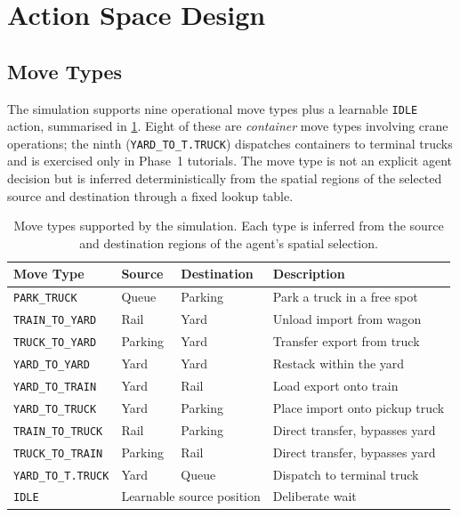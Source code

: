 \section{Action Space Design}
\label{sec:sys:actions}

\subsection{Move Types}
\label{sec:sys:actions:types}

The simulation supports nine operational move types plus a learnable \texttt{IDLE} action, summarised in \cref{tab:sys:move_types}. Eight of these are \emph{container} move types involving crane operations; the ninth (\texttt{YARD\_TO\_T.TRUCK}) dispatches containers to terminal trucks and is exercised only in Phase~1 tutorials. The move type is not an explicit agent decision but is inferred deterministically from the spatial regions of the selected source and destination through a fixed lookup table.

\begin{table}[H]
  \centering
  \caption{Move types supported by the simulation. Each type is inferred from the source and destination regions of the agent's spatial selection.}
  \label{tab:sys:move_types}
  \begin{tabular}{@{} l l l l @{}}
    \toprule
    \textbf{Move Type} & \textbf{Source} & \textbf{Destination} & \textbf{Description} \\
    \midrule
    \texttt{PARK\_TRUCK}      & Queue   & Parking & Park a truck in a free spot \\
    \texttt{TRAIN\_TO\_YARD}  & Rail    & Yard    & Unload import from wagon \\
    \texttt{TRUCK\_TO\_YARD}  & Parking & Yard    & Transfer export from truck \\
    \texttt{YARD\_TO\_YARD}   & Yard    & Yard    & Restack within the yard \\
    \texttt{YARD\_TO\_TRAIN}  & Yard    & Rail    & Load export onto train \\
    \texttt{YARD\_TO\_TRUCK}  & Yard    & Parking & Place import onto pickup truck \\
    \texttt{TRAIN\_TO\_TRUCK} & Rail    & Parking & Direct transfer, bypasses yard \\
    \texttt{TRUCK\_TO\_TRAIN} & Parking & Rail    & Direct transfer, bypasses yard \\
    \texttt{YARD\_TO\_T.TRUCK}& Yard    & Queue   & Dispatch to terminal truck \\
    \midrule
    \texttt{IDLE}             & \multicolumn{2}{l}{Learnable source position} & Deliberate wait \\
    \bottomrule
  \end{tabular}
\end{table}

